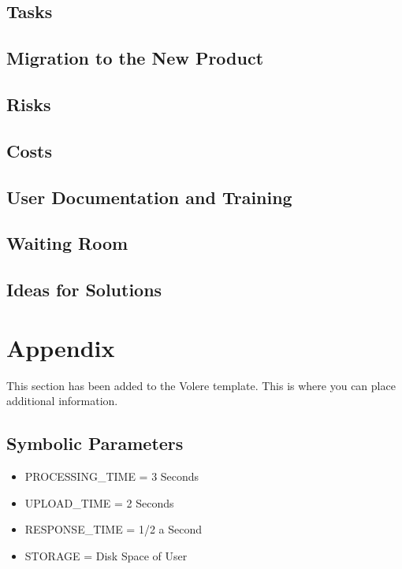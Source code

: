 \documentclass[12pt, titlepage]{article}
\begin{document}
\subsection{Tasks}

\subsection{Migration to the New Product}

\subsection{Risks}

\subsection{Costs}

\subsection{User Documentation and Training}

\subsection{Waiting Room}

\subsection{Ideas for Solutions}





\newpage

\section{Appendix}

This section has been added to the Volere template.  This is where you can place
additional information.

\subsection{Symbolic Parameters}

\begin{itemize}
\item PROCESSING_TIME = 3 Seconds
\item UPLOAD_TIME = 2 Seconds
\item RESPONSE_TIME = 1/2 a Second
\item STORAGE = Disk Space of User
\end{itemize}
\end{document}
